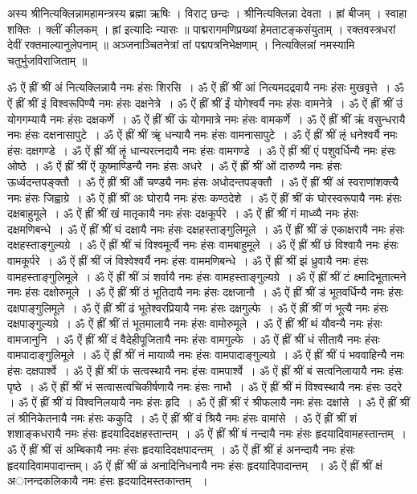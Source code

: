 अस्य श्रीनित्यक्लिन्नामहामन्त्रस्य ब्रह्मा ऋषिः । विराट् छन्दः । श्रीनित्यक्लिन्ना देवता । ह्रां बीजम् । स्वाहा शक्तिः । क्लीं कीलकम् ।
ह्रां इत्यादिः न्यासः ॥
पाद्मरागमणिप्रख्यां हेमताटङ्कसंयुताम् । रक्तवस्त्रधरां देवीं रक्तमाल्यानुलेपनाम् ॥
अञ्जनाञ्चितनेत्रां तां पद्मपत्रनिभेक्षणाम् । नित्यक्लिन्नां नमस्यामि चतुर्भुजविराजिताम् ॥

ॐ ऐं ह्रीं श्रीं अं नित्यक्लिन्नायै नमः हंसः शिरसि~। 
ॐ ऐं ह्रीं श्रीं आं नित्यमदद्रवायै नमः हंसः मुखवृत्ते~। 
ॐ ऐं ह्रीं श्रीं इं विश्वरूपिण्यै नमः हंसः दक्षनेत्रे~। 
ॐ ऐं ह्रीं श्रीं ईं योगेश्वर्यै नमः हंसः वामनेत्रे~। 
ॐ ऐं ह्रीं श्रीं उं योगगम्यायै नमः हंसः दक्षकर्णे~। 
ॐ ऐं ह्रीं श्रीं ऊं योगमात्रे नमः हंसः वामकर्णे~। 
ॐ ऐं ह्रीं श्रीं ऋं वसुन्धरायै नमः हंसः दक्षनासापुटे~। 
ॐ ऐं ह्रीं श्रीं ॠं धन्यायै नमः हंसः वामनासापुटे~। 
ॐ ऐं ह्रीं श्रीं ऌं धनेश्वर्यै नमः हंसः दक्षगण्डे~। 
ॐ ऐं ह्रीं श्रीं ऌृं धान्यरत्नदायै नमः हंसः वामगण्डे~। 
ॐ ऐं ह्रीं श्रीं एं पशुवर्धिन्यै नमः हंसः ओष्ठे~। 
ॐ ऐं ह्रीं श्रीं ऐं कूष्माण्डिन्यै नमः हंसः अधरे~। 
ॐ ऐं ह्रीं श्रीं ओं दारुण्यै नमः हंसः ऊर्ध्वदन्तपङ्क्तौ~। 
ॐ ऐं ह्रीं श्रीं औं चण्ड्यै नमः हंसः अधोदन्तपङ्क्तौ~। 
ॐ ऐं ह्रीं श्रीं अं स्वराणांशक्त्यै नमः हंसः जिह्वाग्रे~। 
ॐ ऐं ह्रीं श्रीं अः घोरायै नमः हंसः कण्ठदेशे~। 
ॐ ऐं ह्रीं श्रीं कं घोरस्वरूपायै नमः हंसः दक्षबाहुमूले~। 
ॐ ऐं ह्रीं श्रीं खं मातृकायै नमः हंसः दक्षकूर्परे~। 
ॐ ऐं ह्रीं श्रीं गं माध्व्यै नमः हंसः दक्षमणिबन्धे~। 
ॐ ऐं ह्रीं श्रीं घं दक्षायै नमः हंसः दक्षहस्ताङ्गुलिमूले~। 
ॐ ऐं ह्रीं श्रीं ङं एकाक्षरायै नमः हंसः दक्षहस्ताङ्गुल्यग्रे~। 
ॐ ऐं ह्रीं श्रीं चं विश्वमूर्त्यै नमः हंसः वामबाहुमूले~। 
ॐ ऐं ह्रीं श्रीं छं विश्वायै नमः हंसः वामकूर्परे~। 
ॐ ऐं ह्रीं श्रीं जं विश्वेश्वर्यै नमः हंसः वाममणिबन्धे~। 
ॐ ऐं ह्रीं श्रीं झं ध्रुवायै नमः हंसः वामहस्ताङ्गुलिमूले~। 
ॐ ऐं ह्रीं श्रीं ञं शर्वायै नमः हंसः वामहस्ताङ्गुल्यग्रे~। 
ॐ ऐं ह्रीं श्रीं टं क्ष्मादिभूतात्मने नमः हंसः दक्षोरुमूले~। 
ॐ ऐं ह्रीं श्रीं ठं भूतिदायै नमः हंसः दक्षजानौ~। 
ॐ ऐं ह्रीं श्रीं डं भूतवर्धिन्यै नमः हंसः दक्षपाङ्गुलिमूले~। 
ॐ ऐं ह्रीं श्रीं ढं भूतेश्वरप्रियायै नमः हंसः दक्षगुल्फे~। 
ॐ ऐं ह्रीं श्रीं णं भूत्यै नमः हंसः दक्षपाङ्गुल्यग्रे~। 
ॐ ऐं ह्रीं श्रीं तं भूतमालायै नमः हंसः वामोरुमूले~।
ॐ ऐं ह्रीं श्रीं थं यौवन्यै नमः हंसः वामजानुनि~। 
ॐ ऐं ह्रीं श्रीं दं वैदेहीपूजितायै नमः हंसः वामगुल्फे~। 
ॐ ऐं ह्रीं श्रीं धं सीतायै नमः हंसः वामपादाङ्गुलिमूले~। 
ॐ ऐं ह्रीं श्रीं नं मायाव्यै नमः हंसः वामपादाङ्गुल्यग्रे~। 
ॐ ऐं ह्रीं श्रीं पं भववाहिन्यै नमः हंसः दक्षपार्श्वे~। 
ॐ ऐं ह्रीं श्रीं फं सत्वस्थायै नमः हंसः वामपार्श्वे~।
ॐ ऐं ह्रीं श्रीं बं सत्वनिलायायै नमः हंसः पृष्ठे~।
ॐ ऐं ह्रीं श्रीं भं सत्वासत्वचिकीर्षणायै नमः हंसः नाभौ~। 
ॐ ऐं ह्रीं श्रीं मं विश्वस्थायै नमः हंसः उदरे ।
ॐ ऐं ह्रीं श्रीं यं विश्वनिलयायै नमः हंसः हृदि~। 
ॐ ऐं ह्रीं श्रीं रं श्रीफलायै नमः हंसः दक्षांसे~। 
ॐ ऐं ह्रीं श्रीं लं श्रीनिकेतनायै नमः हंसः ककुदि~। 
ॐ ऐं ह्रीं श्रीं वं श्रियै नमः हंसः वामांसे~। 
ॐ ऐं ह्रीं श्रीं शं शशाङ्कधरायै नमः हंसः हृदयादिदक्षहस्तान्तम्~।
ॐ ऐं ह्रीं श्रीं षं नन्दायै नमः हंसः हृदयादिवामहस्तान्तम्~। 
ॐ ऐं ह्रीं श्रीं सं अम्बिकायै नमः हंसः हृदयादिदक्षपादन्तम्~। 
ॐ ऐं ह्रीं श्रीं हं अनन्दायै नमः हंसः हृदयादिवामपादान्तम्। 
ॐ ऐं ह्रीं श्रीं ळं अनादिनिधनायै नमः हंसः हृदयादिपादान्तम् ~। 
ॐ ऐं ह्रीं श्रीं क्षं अानन्दकलिकायै नमः हंसः हृदयादिमस्तकान्तम् ~।

